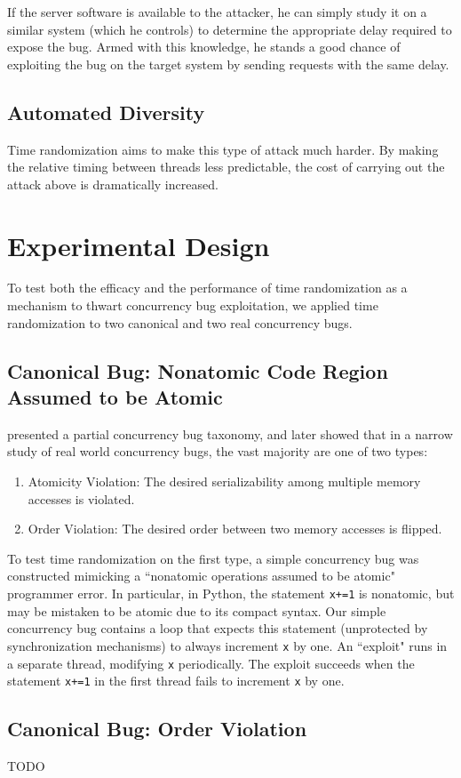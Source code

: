 \documentclass[letterpaper,twocolumn,10pt]{article}
\begin{document}
If the server software is available to the attacker, he can simply study it on a similar system (which he controls) to determine the appropriate delay required to expose the bug.
Armed with this knowledge, he stands a good chance of exploiting the bug on the target system by sending requests with the same delay.
\subsection{Automated Diversity}
Time randomization aims to make this type of attack much harder.
By making the relative timing between threads less predictable, the cost of carrying out the attack above is dramatically increased.

\section{Experimental Design}
To test both the efficacy and the performance of time randomization as a mechanism to thwart concurrency bug exploitation, we applied time randomization to two canonical and two real concurrency bugs.
\subsection{Canonical Bug: Nonatomic Code Region Assumed to be Atomic}
\cite{Farchi2003} presented a partial concurrency bug taxonomy, and \cite{Lu2008} later showed that in a narrow study of real world concurrency bugs, the vast majority are one of two types:
\begin{enumerate}
	\item Atomicity Violation: The desired serializability among multiple memory accesses is violated.
	\item Order Violation: The desired order between two memory accesses is flipped.
\end{enumerate}
To test time randomization on the first type, a simple concurrency bug was constructed mimicking a ``nonatomic operations assumed to be atomic" programmer error.  In particular, in Python, the statement \texttt{x+=1} is nonatomic, but may be mistaken to be atomic due to its compact syntax.  Our simple concurrency bug contains a loop that expects this statement (unprotected by synchronization mechanisms) to always increment \texttt{x} by one.  An ``exploit" runs in a separate thread, modifying \texttt{x} periodically.  The exploit succeeds when the statement \texttt{x+=1} in the first thread fails to increment \texttt{x} by one.
\subsection{Canonical Bug: Order Violation}
TODO
\end{document}
